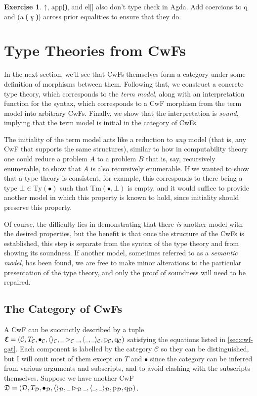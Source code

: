 \documentclass{article}
\renewcommand{\_}{\textrm{\textscale{.5}{\textunderscore}}}
\DeclarePairedDelimiter{\ctxt}{\langle}{\rangle}
\newcommand{\Tm}{\mathrm{Tm}}
\newcommand{\Ty}{\mathrm{Ty}}
\newcommand{\p}{\mathrm{p}}
\newcommand{\q}{\mathrm{q}}
\theoremstyle{definition}
\newtheorem{exercise}[definition]{Exercise}
\theoremstyle{plain}
\begin{document}
\begin{exercise}
{\codefont ↑}, {\codefont app⟮⟯}, and {\codefont el[]}
also don't type check in Agda.
Add coercions to {\codefont q} and {\codefont (a ⟮ γ ⟯)} across prior equalities to ensure that they do.
\end{exercise}

\section{Type Theories from CwFs}

In the next section, we'll see that CwFs themselves form a category
under some definition of morphisms between them.
Following that, we construct a concrete type theory,
which corresponds to the \emph{term model},
along with an interpretation function for the syntax,
which corresponds to a CwF morphism from the term model into arbitrary CwFs.
Finally, we show that the interpretation is \emph{sound},
implying that the term model is initial in the category of CwFs.

The initiality of the term model acts like a reduction to \emph{any} model
(that is, any CwF that supports the same structures),
similar to how in computability theory one could reduce a problem $A$ to a problem $B$ that is,
say, recursively enumerable, to show that $A$ is also recursively enumerable.
If we wanted to show that a type theory is consistent, for example,
this corresponds to there being a type $\bot \in \Ty(\bullet)$ such that $\Tm(\bullet, \bot)$ is empty,
and it would suffice to provide another model in which this property is known to hold,
since initiality should preserve this property.

Of course, the difficulty lies in demonstrating that there \emph{is} another model with the desired properties,
but the benefit is that once the structure of the CwFs is established,
this step is separate from the syntax of the type theory and from showing its soundness.
If another model, sometimes referred to as a \emph{semantic model}, has been found,
we are free to make minor alterations to the particular presentation of the type theory,
and only the proof of soundness will need to be repaired.

\subsection{The Category of CwFs}

A CwF can be succinctly described by a tuple
$\mathfrak{C} = (\mathcal{C}, T_\mathcal{C}, \bullet_\mathcal{C}, \ctxt{}_\mathcal{C}, \_\rhd_\mathcal{C}\_, \ctxt{\_, \_}_\mathcal{C}, \p_\mathcal{C}, \q_\mathcal{C})$
satisfying the equations listed in \cref{sec:cwf-gat}.
Each component is labelled by the category $\mathcal{C}$ so they can be distinguished,
but I will omit most of them except on $T$ and $\bullet$
since the category can be inferred from various arguments and subscripts,
and to avoid clashing with the subscripts themselves.
Suppose we have another CwF
$\mathfrak{D} = (\mathcal{D}, T_\mathcal{D}, \bullet_\mathcal{D}, \ctxt{}_\mathcal{D}, \_\rhd_\mathcal{D}\_, \ctxt{\_, \_}_\mathcal{D}, \p_\mathcal{D}, \q_\mathcal{D})$.
\end{document}
